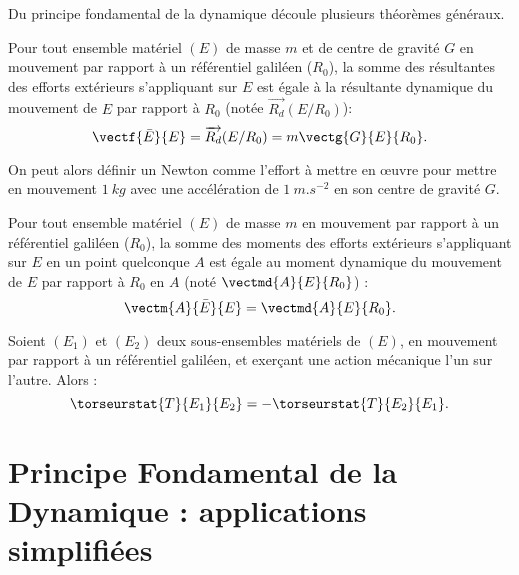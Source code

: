 Du principe fondamental de la dynamique découle plusieurs théorèmes généraux.

\begin{theorem}
			Pour tout ensemble matériel $(E)$ de masse $m$ et de centre de gravité $G$ en mouvement par rapport à un référentiel galiléen ($R_0$), la somme des résultantes des efforts extérieurs s'appliquant sur $E$ est égale à la résultante dynamique du mouvement de $E$ par rapport à $R_0$ (notée $\overrightarrow{R_d}(E/R_0)$): 
$$\vectf{\bar E}{E}=\overrightarrow{R_d}(E/R_0)=m\vectg{G}{E}{R_0}.$$
\end{theorem}

\begin{rem}
On peut alors définir un Newton comme l'effort à mettre en \oe{}uvre pour mettre en mouvement $\SI{1}{kg}$ avec une accélération de $\SI{1}{m.s^{-2}}$ en son centre de gravité $G$.
\end{rem}
\begin{theorem}
			Pour tout ensemble matériel $(E)$ de masse $m$ en mouvement par rapport à un référentiel galiléen ($R_0$), la somme des moments des efforts extérieurs s'appliquant sur $E$ en un point quelconque $A$ est égale au moment dynamique du mouvement de $E$ par rapport à $R_0$ en $A$ (noté $\vectmd{A}{E}{R_0}$) : 
$$\vectm{A}{\bar E}{E}=\vectmd{A}{E}{R_0}.$$
\end{theorem}

\begin{theorem}
Soient $(E_1)$ et $(E_2)$ deux sous-ensembles matériels de $(E)$,
en mouvement par rapport à un référentiel galiléen, et exerçant une action mécanique l'un sur l'autre. Alors :
	$$\torseurstat{T}{E_1}{E_2}=-\torseurstat{T}{E_2}{E_1}.$$
\end{theorem}
		


\section[PFD : applications simplifiées]{Principe Fondamental de la Dynamique : applications simplifiées}

